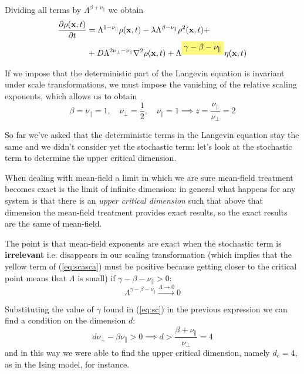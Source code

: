 \documentclass[\main/main.tex]{subfiles}
\begin{document}
Dividing all terms by $\Lambda^{\beta+\nu_{\|}}$ we obtain
\begin{align}
\frac{\partial \rho(\mathbf{x}, t)}{\partial t}&=\Lambda^{1-\nu_{\|}} \rho(\mathbf{x}, t)-\lambda \Lambda^{\beta-\nu_{\|}} \rho^{2}(\mathbf{x}, t)+\\
&+D \Lambda^{2 \nu_{\perp}-\nu_{\|}} \nabla^{2} \rho(\mathbf{x}, t)+\Lambda^{\hlc{yellow}{\gamma-\beta-\nu_{\|}}} \eta(\mathbf{x}, t)    
\label{eq:scasca}
\end{align}

If we impose that the deterministic part of the Langevin equation is invariant under scale transformations, we must impose the vanishing of the relative scaling exponents, which allows us to obtain
$$
\beta=\nu_\|=1, \quad \nu_{\perp}=\frac{1}{2}, \quad \nu_{\|}=1 \implies z=\frac{\nu_\|}{\nu_\perp}=2
$$

So far we've asked that the deterministic terms in the Langevin equation stay the same and we didn't consider yet the stochastic term: let's look at the stochastic term to determine the upper critical dimension.

\begin{appr}
When dealing with mean-field a limit in which we are sure mean-field treatment becomes exact is the limit of infinite dimension: in general what happens for any system is that there is an \textit{upper critical dimension} such that above that dimension the mean-field treatment provides exact results, so the exact results are the same of mean-field.
\end{appr}

The point is that mean-field exponents are exact when the stochastic term is \textbf{irrelevant} i.e. disappears in our scaling transformation (which implies that the yellow term of (\ref{eq:scasca}) must be positive because getting closer to the critical point means that $\Lambda$ is small) if $\gamma - \beta -\nu_\|>0$:
\begin{equation}
    \Lambda^{{\gamma-\beta-\nu_{\|}}}  \overset{\Lambda\to 0}{\longrightarrow} 0
\end{equation}

Substituting the value of $\gamma$ found in (\ref{eq:sc}) in the previous expression  we can find a condition on the dimension $d$:
\begin{equation}
    d\nu_\perp - \beta \nu_\|>0 \implies \boxed{d>\frac{\beta+\nu_\|}{\nu_\perp}=4}
\end{equation}
and in this way we were able to find the upper critical dimension, namely $d_c=4$, as in the Ising model, for instance.
\end{document}
